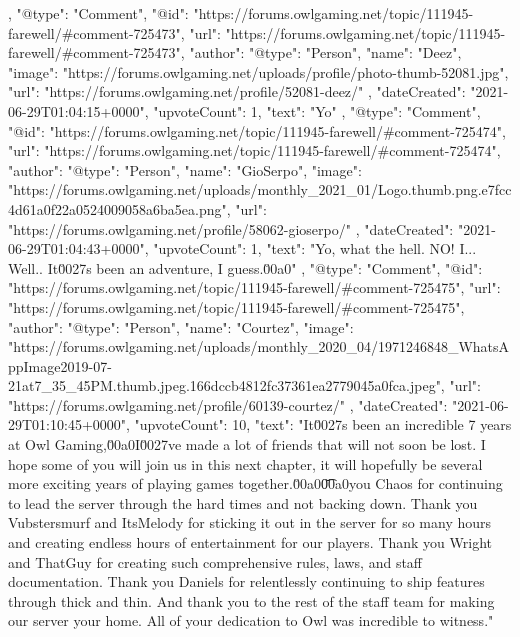 {{        },
        {
            "@type": "Comment",
            "@id": "https://forums.owlgaming.net/topic/111945-farewell/#comment-725473",
            "url": "https://forums.owlgaming.net/topic/111945-farewell/#comment-725473",
            "author": {
                "@type": "Person",
                "name": "Deez",
                "image": "https://forums.owlgaming.net/uploads/profile/photo-thumb-52081.jpg",
                "url": "https://forums.owlgaming.net/profile/52081-deez/"
            },
            "dateCreated": "2021-06-29T01:04:15+0000",
            "upvoteCount": 1,
            "text": "Yo\n \n"
        },
        {
            "@type": "Comment",
            "@id": "https://forums.owlgaming.net/topic/111945-farewell/#comment-725474",
            "url": "https://forums.owlgaming.net/topic/111945-farewell/#comment-725474",
            "author": {
                "@type": "Person",
                "name": "GioSerpo",
                "image": "https://forums.owlgaming.net/uploads/monthly_2021_01/Logo.thumb.png.e7fcc4d61a0f22a0524009058a6ba5ea.png",
                "url": "https://forums.owlgaming.net/profile/58062-gioserpo/"
            },
            "dateCreated": "2021-06-29T01:04:43+0000",
            "upvoteCount": 1,
            "text": "Yo, what the hell. NO! I... Well.. It\u0027s been an adventure, I guess.\u00a0\n \n"
        },
        {
            "@type": "Comment",
            "@id": "https://forums.owlgaming.net/topic/111945-farewell/#comment-725475",
            "url": "https://forums.owlgaming.net/topic/111945-farewell/#comment-725475",
            "author": {
                "@type": "Person",
                "name": "Courtez",
                "image": "https://forums.owlgaming.net/uploads/monthly_2020_04/1971246848_WhatsAppImage2019-07-21at7_35_45PM.thumb.jpeg.166dccb4812fc37361ea2779045a0fca.jpeg",
                "url": "https://forums.owlgaming.net/profile/60139-courtez/"
            },
            "dateCreated": "2021-06-29T01:10:45+0000",
            "upvoteCount": 10,
            "text": "It\u0027s been an incredible 7 years at Owl Gaming,\u00a0I\u0027ve made a lot of friends that will not soon be lost. I hope some of you will join us in this next chapter, it will hopefully be several more exciting years of playing games together.\u00a0\n \n\n\n\t\u00a0\n \n\n\n\tThank you Chaos for continuing to lead the server through the hard times and not backing down. Thank you Vubstersmurf and ItsMelody for sticking it out in the server for so many hours and creating endless hours of entertainment for our players. Thank you Wright and ThatGuy for creating such comprehensive rules, laws, and staff documentation. Thank you Daniels for relentlessly continuing to ship features through thick and thin. And thank you to the rest of the staff team for making our server your home. All of your dedication to Owl was incredible to witness.\n \n"
}}
